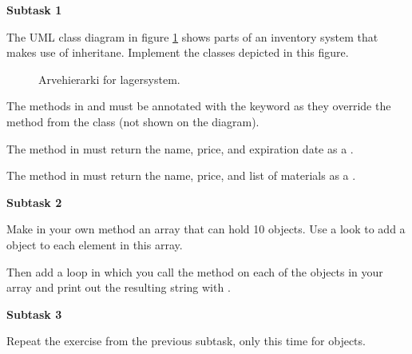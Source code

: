 \textbf{Subtask 1}

The UML class diagram in figure \ref{inheritance:inventory:uml} shows parts of an inventory system that makes use of inheritane. Implement the classes depicted in this figure.

\begin{figure}[tbp]
  \caption{\label{inheritance:inventory:uml} Arvehierarki for lagersystem.}
\end{figure}

The  methods in  and  must be annotated with the  keyword as they override the method from the  class (not shown on the diagram).

The  method in  must return the name, price, and expiration date as a .

The  method in  must return the name, price, and list of materials as a .

\textbf{Subtask 2}

Make in your own  method an array that can hold 10  objects. Use a look to add a  object to each element in this array.

Then add a loop in which you call the  method on each of the  objects in your array and print out the resulting string with .

\textbf{Subtask 3}

Repeat the exercise from the previous subtask, only this time for  objects.




